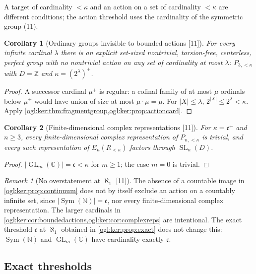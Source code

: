 \documentclass[11pt,oneside]{article}
\numberwithin{equation}{section}
\newtheorem{corollary}[corollary]{Corollary}
\theoremstyle{definition}
\theoremstyle{remark}
\newtheorem{remark}[remark]{Remark}
\newcommand{\Z}{\mathbb Z}
\newcommand{\C}{\mathbb C}
\newcommand{\N}{\mathbb N}
\newcommand{\GL}{\operatorname{GL}}
\newcommand{\SL}{\operatorname{SL}}
\newcommand{\Sym}{\operatorname{Sym}}
\newcommand{\src}[1]{\textup{\textsf{\small[#1]}}}
\begin{document}
A target of cardinality $<\kappa$ and an action on a set of cardinality
$<\kappa$ are different conditions; the action threshold uses the cardinality of
the symmetric group (11).

\begin{corollary}[Ordinary groups invisible to bounded actions \src{11}]\label{ogl:ker:cor:boundedactions}
For every infinite cardinal $\lambda$ there is an explicit set-sized nontrivial,
torsion-free, centerless, perfect group with no nontrivial action on any set of
cardinality at most $\lambda$: $P_{3,<\kappa}$ with $D=\Z$ and
$\kappa=(2^\lambda)^+$.
\end{corollary}
\begin{proof}
A successor cardinal $\mu^+$ is regular: a cofinal family of at most $\mu$
ordinals below $\mu^+$ would have union of size at most $\mu\cdot\mu=\mu$. For
$|X|\le\lambda$, $2^{|X|}\le2^\lambda<\kappa$. Apply
\cref{ogl:ker:thm:fragmentgroup,ogl:ker:prop:actioncard}.
\end{proof}

\begin{corollary}[Finite-dimensional complex representations \src{11}]\label{ogl:ker:cor:complexreps}
For $\kappa=\mathfrak c^+$ and $n\ge3$, every finite-dimensional complex
representation of $P_{n,<\kappa}$ is trivial, and every such representation of
$E_n(R_{<\kappa})$ factors through $\SL_n(D)$.
\end{corollary}
\begin{proof}
$|\GL_m(\C)|=\mathfrak c<\kappa$ for $m\ge1$; the case $m=0$ is trivial.
\end{proof}

\begin{remark}[No overstatement at $\aleph_1$ \src{11}]\label{ogl:ker:rem:aleph1}
The absence of a countable image in \cref{ogl:ker:prop:continuum} does not by
itself exclude an action on a countably infinite set, since $|\Sym(\N)|=\mathfrak c$,
nor every finite-dimensional complex representation. The larger cardinals in
\cref{ogl:ker:cor:boundedactions,ogl:ker:cor:complexreps} are intentional.
The exact threshold $\mathfrak c$ at $\aleph_1$ obtained in
\cref{ogl:ker:prop:exact} does not change this: $\Sym(\N)$ and $\GL_m(\C)$ have
cardinality exactly $\mathfrak c$.
\end{remark}

\subsection{Exact thresholds}
\end{document}
